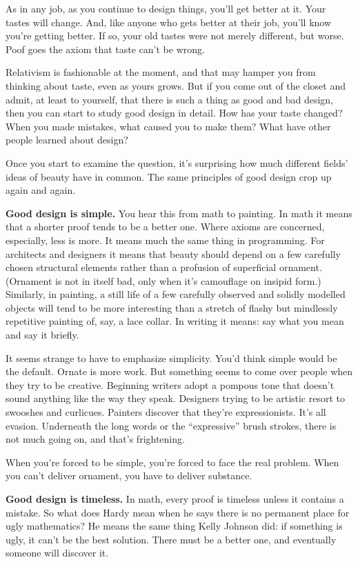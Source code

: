 \documentclass[12pt]{book}
\begin{document}
As in any job, as you continue to design things, you'll get better at
it. Your tastes will change. And, like anyone who gets better at their
job, you'll know you're getting better. If so, your old tastes were not
merely different, but worse. Poof goes the axiom that taste can't be
wrong.

Relativism is fashionable at the moment, and that may hamper you from
thinking about taste, even as yours grows. But if you come out of the
closet and admit, at least to yourself, that there is such a thing as
good and bad design, then you can start to study good design in detail.
How has your taste changed? When you made mistakes, what caused you to
make them? What have other people learned about design?

Once you start to examine the question, it's surprising how much
different fields' ideas of beauty have in common. The same principles of
good design crop up again and again.

\textbf{Good design is simple.} You hear this from math to painting. In
math it means that a shorter proof tends to be a better one. Where
axioms are concerned, especially, less is more. It means much the same
thing in programming. For architects and designers it means that beauty
should depend on a few carefully chosen structural elements rather than
a profusion of superficial ornament. (Ornament is not in itself bad,
only when it's camouflage on insipid form.) Similarly, in painting, a
still life of a few carefully observed and solidly modelled objects will
tend to be more interesting than a stretch of flashy but mindlessly
repetitive painting of, say, a lace collar. In writing it means: say
what you mean and say it briefly.

It seems strange to have to emphasize simplicity. You'd think simple
would be the default. Ornate is more work. But something seems to come
over people when they try to be creative. Beginning writers adopt a
pompous tone that doesn't sound anything like the way they speak.
Designers trying to be artistic resort to swooshes and curlicues.
Painters discover that they're expressionists. It's all evasion.
Underneath the long words or the ``expressive'' brush strokes, there is
not much going on, and that's frightening.

When you're forced to be simple, you're forced to face the real problem.
When you can't deliver ornament, you have to deliver substance.

\textbf{Good design is timeless.} In math, every proof is timeless
unless it contains a mistake. So what does Hardy mean when he says there
is no permanent place for ugly mathematics? He means the same thing
Kelly Johnson did: if something is ugly, it can't be the best solution.
There must be a better one, and eventually someone will discover it.
\end{document}

